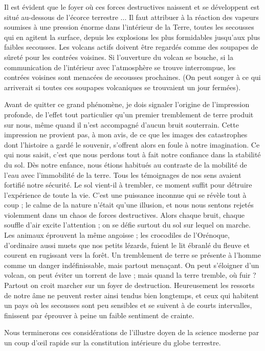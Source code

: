 \documentclass[a4paper, 11pt, oneside]{article}
\begin{document}
Il est évident que le foyer où ces forces destructives naissent et se développent est situé au-dessous de l'écorce terrestre ... Il faut attribuer à la réaction des vapeurs soumises à une pression énorme dans l'intérieur de la Terre, toutes les secousses qui en agitent la surface, depuis les explosions les plus formidables jusqu'aux plus faibles secousses. Les volcans actifs doivent être regardés comme des soupapes de sûreté pour les contrées voisines. Si l'ouverture du volcan se bouche, si la communication de l'intérieur avec l'atmosphère se trouve interrompue, les contrées voisines sont menacées de secousses prochaines. (On peut songer à ce qui arriverait si toutes ces soupapes volcaniques se trouvaient un jour fermées).

Avant de quitter ce grand phénomène, je dois signaler l'origine de l'impression profonde, de l'effet tout particulier qu'un premier tremblement de terre produit sur nous, même quand il n'est accompagné d'aucun bruit souterrain. Cette impression ne provient pas, à mon avis, de ce que les images des catastrophes dont l'histoire a gardé le souvenir, s'offrent alors en foule à notre imagination. Ce qui nous saisit, c'est que nous perdons tout à fait notre confiance dans la stabilité du sol. Dès notre enfance, nous étions habitués au contraste de la mobilité de l'eau avec l'immobilité de la terre. Tous les témoignages de nos sens avaient fortifié notre sécurité. Le sol vient-il à trembler, ce moment suffit pour détruire l'expérience de toute la vie. C'est une puissance inconnue qui se révèle tout à coup ; le calme de la nature n'était qu'une illusion, et nous nous sentons rejetés violemment dans un chaos de forces destructives. Alors chaque bruit, chaque souffle d'air excite l'attention ; on se défie surtout du sol sur lequel on marche. Les animaux éprouvent la même angoisse ; les crocodiles de l'Orénoque, d'ordinaire aussi muets que nos petits lézards, fuient le lit ébranlé du fleuve et courent en rugissant vers la forêt. Un tremblement de terre se présente à l'homme comme un danger indéfinissable, mais partout menaçant. On peut s'éloigner d'un volcan, on peut éviter un torrent de lave ; mais quand la terre tremble, où fuir ? Partout on croit marcher sur un foyer de destruction. Heureusement les ressorts de notre âme ne peuvent rester ainsi tendus bien longtemps, et ceux qui habitent un pays où les secousses sont peu sensibles et se suivent à de courts intervalles, finissent par éprouver à peine un faible sentiment de crainte.

Nous terminerons ces considérations de l'illustre doyen de la science moderne par un coup d'œil rapide sur la constitution intérieure du globe terrestre.
\end{document}
